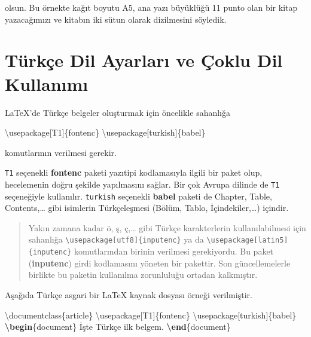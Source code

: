 \documentclass[
  10pt,
]{scrbook}
\newenvironment{Shaded}{}{}
\newcommand{\BuiltInTok}[1]{#1}
\newcommand{\ExtensionTok}[1]{#1}
\newcommand{\KeywordTok}[1]{\textcolor[rgb]{0.00,0.44,0.13}{\textbf{#1}}}
\newcommand{\NormalTok}[1]{#1}
\theoremstyle{definition}
\theoremstyle{definition}
\theoremstyle{definition}
\theoremstyle{definition}
\theoremstyle{remark}
\begin{document}
olsun. Bu örnekte kağıt boyutu A5, ana yazı büyüklüğü 11 punto olan bir kitap yazacağımızı ve kitabın iki sütun olarak dizilmesini söyledik.

\hypertarget{turkce}{%
\section{Türkçe Dil Ayarları ve Çoklu Dil Kullanımı}\label{turkce}}

LaTeX'de Türkçe belgeler oluşturmak için öncelikle sahanlığa

\begin{Shaded}
\begin{Highlighting}[]
\BuiltInTok{\textbackslash{}usepackage}\NormalTok{[T1]\{}\ExtensionTok{fontenc}\NormalTok{\}}
\BuiltInTok{\textbackslash{}usepackage}\NormalTok{[turkish]\{}\ExtensionTok{babel}\NormalTok{\}}
\end{Highlighting}
\end{Shaded}

komutlarının verilmesi gerekir.

\texttt{T1} seçenekli \textbf{fontenc} paketi yazıtipi kodlamasıyla ilgili bir paket olup, hecelemenin doğru şekilde yapılmasını sağlar. Bir çok Avrupa dilinde de \texttt{T1} seçeneğiyle kullanılır. \texttt{turkish} seçenekli \textbf{babel} paketi de Chapter, Table, Contents,\ldots{} gibi isimlerin Türkçeleşmesi (Bölüm, Tablo, İçindekiler,\ldots) içindir.

\begin{quote}
Yakın zamana kadar ö, ş, ç,\ldots{} gibi Türkçe karakterlerin kullanılabilmesi için sahanlığa \texttt{\textbackslash{}usepackage{[}utf8{]}\{inputenc\}} ya da \texttt{\textbackslash{}usepackage{[}latin5{]}\{inputenc\}} komutlarından birinin verilmesi gerekiyordu. Bu paket (\textbf{inputenc}) girdi kodlamasını yöneten bir pakettir. Son güncellemelerle birlikte bu paketin kullanılma zorunluluğu ortadan kalkmıştır.
\end{quote}

Aşağıda Türkçe asgari bir LaTeX kaynak dosyası örneği verilmiştir.

\begin{Shaded}
\begin{Highlighting}[]
\BuiltInTok{\textbackslash{}documentclass}\NormalTok{\{}\ExtensionTok{article}\NormalTok{\}}
\BuiltInTok{\textbackslash{}usepackage}\NormalTok{[T1]\{}\ExtensionTok{fontenc}\NormalTok{\}}
\BuiltInTok{\textbackslash{}usepackage}\NormalTok{[turkish]\{}\ExtensionTok{babel}\NormalTok{\}}
\KeywordTok{\textbackslash{}begin}\NormalTok{\{}\ExtensionTok{document}\NormalTok{\}}
\NormalTok{  İşte  Türkçe ilk belgem.}
\KeywordTok{\textbackslash{}end}\NormalTok{\{}\ExtensionTok{document}\NormalTok{\}}
\end{Highlighting}
\end{Shaded}
\end{document}
